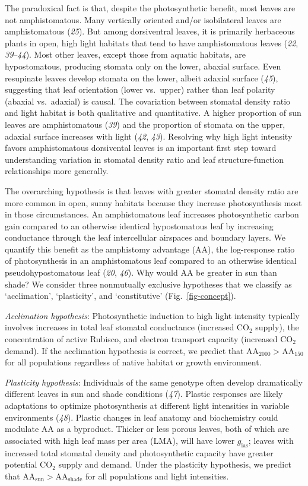\documentclass[
  letterpaper,
  DIV=11,
  numbers=noendperiod]{scrartcl}
\newcommand{\aahigh}{\mathrm{AA}_{2000}}
\newcommand{\aalow}{\mathrm{AA}_{150}}
\newcommand{\aashade}{\mathrm{AA}_{\text{shade}}}
\newcommand{\aasun}{\mathrm{AA}_{\text{sun}}}
\newcommand{\aax}{$\mathrm{AA}$}
\newcommand{\gias}{$g_\text{ias}$}
\begin{document}
The paradoxical fact is that, despite the photosynthetic benefit, most
leaves are not amphistomatous. Many vertically oriented and/or
isobilateral leaves are amphistomatous (\emph{25}). But among
dorsiventral leaves, it is primarily herbaceous plants in open, high
light habitats that tend to have amphistomatous leaves (\emph{22},
\emph{39}--\emph{44}). Most other leaves, except those from aquatic
habitats, are hypostomatous, producing stomata only on the lower,
abaxial surface. Even resupinate leaves develop stomata on the lower,
albeit adaxial surface (\emph{45}), suggesting that leaf orientation
(lower vs.~upper) rather than leaf polarity (abaxial vs.~adaxial) is
causal. The covariation between stomatal density ratio and light habitat
is both qualitative and quantitative. A higher proportion of sun leaves
are amphistomatous (\emph{39}) and the proportion of stomata on the
upper, adaxial surface increases with light (\emph{42}, \emph{43}).
Resolving why high light intensity favors amphistomatous dorsivental
leaves is an important first step toward understanding variation in
stomatal density ratio and leaf structure-function relationships more
generally.

The overarching hypothesis is that leaves with greater stomatal density
ratio are more common in open, sunny habitats because they increase
photosynthesis most in those circumstances. An amphistomatous leaf
increases photosynthetic carbon gain compared to an otherwise identical
hypostomatous leaf by increasing conductance through the leaf
intercellular airspaces and boundary layers. We quantify this benefit as
the amphistomy advantage (\aax{}), the log-response ratio of
photosynthesis in an amphistomatous leaf compared to an otherwise
identical pseudohypostomatous leaf (\emph{20}, \emph{46}). Why would
\aax{} be greater in sun than shade? We consider three nonmutually
exclusive hypotheses that we classify as `acclimation', `plasticity',
and `constitutive' (Fig.~\ref{fig-concept}).

\emph{Acclimation hypothesis}: Photosynthetic induction to high light
intensity typically involves increases in total leaf stomatal
conductance (increased CO\(_2\) supply), the concentration of active
Rubisco, and electron transport capacity (increased CO\(_2\) demand). If
the acclimation hypothesis is correct, we predict that
\(\aahigh{} > \aalow{}\) for all populations regardless of native
habitat or growth environment.

\emph{Plasticity hypothesis}: Individuals of the same genotype often
develop dramatically different leaves in sun and shade conditions
(\emph{47}). Plastic responses are likely adaptations to optimize
photosynthesis at different light intensities in variable environments
(\emph{48}). Plastic changes in leaf anatomy and biochemistry could
modulate \aax{} as a byproduct. Thicker or less porous leaves, both of
which are associated with high leaf mass per area (LMA), will have lower
\gias; leaves with increased total stomatal density and photosynthetic
capacity have greater potential CO\(_2\) supply and demand. Under the
plasticity hypothesis, we predict that \(\aasun{} > \aashade{}\) for all
populations and light intensities.
\end{document}
